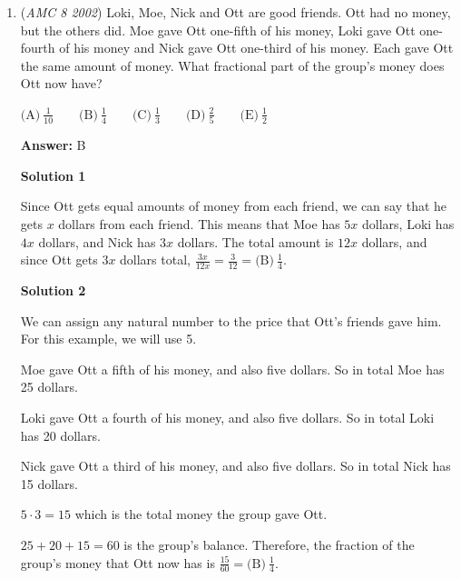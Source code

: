 \begin{enumerate}
 
 \[\frac{8/3}{8/3+4} \times 100 = \frac{8}{8+12} \times 100  = \boxed{\text{(B)}\ 40}\]




\textbf{Solution 2}

Since it doesn't matter how many pears and oranges there are, you can make the number of them whatever you like. In this case, we could use $6$, because it's the LCM of $2$ and $3$. Then for the $6$ pears, there are $6/3*8=16$ ounces of pear juice. For the 6 oranges, there are $6/2*8=24$ ounces of orange juice. Since we are looking for the percent of pear juice, we need to do $16/(16+24)=16/40$. Simplifying, we get $2/5$. Hence the answer is $\boxed{\text{(B)}\ 40}$.

 


	\item (\textit{AMC 8 2002}) Loki, Moe, Nick and Ott are good friends. Ott had no money, but the others did. Moe gave Ott one-fifth of his money, Loki gave Ott one-fourth of his money and Nick gave Ott one-third of his money. Each gave Ott the same amount of money. What fractional part of the group's money does Ott now have?


 $\text{(A)}\ \frac{1}{10} \qquad \text{(B)}\ \frac{1}{4} \qquad \text{(C)}\ \frac{1}{3} \qquad \text{(D)}\ \frac{2}{5} \qquad \text{(E)}\ \frac{1}{2}$

 \textbf{Answer: }B



\textbf{Solution 1}

Since Ott gets equal amounts of money from each friend, we can say that he gets $x$ dollars from each friend. This means that Moe has $5x$ dollars, Loki has $4x$ dollars, and Nick has $3x$ dollars. The total amount is $12x$ dollars, and since Ott gets $3x$ dollars total, $\frac{3x}{12x}= \frac{3}{12} = \boxed{\text{(B)}\ \frac14}$.

 



\textbf{Solution 2}

We can assign any natural number to the price that Ott's friends gave him. For this example, we will use 5.

 Moe gave Ott a fifth of his money, and also five dollars. So in total Moe has 25 dollars.

 Loki gave Ott a fourth of his money, and also five dollars. So in total Loki has 20 dollars.

 Nick gave Ott a third of his money, and also five dollars. So in total Nick has 15 dollars.

 $5\cdot3=15$ which is the total money the group gave Ott.

 $25+20+15=60$ is the group's balance. Therefore, the fraction of the group's money that Ott now has is $\frac{15}{60} = \boxed{\text{(B)}\ \frac14}$.

 


\end{enumerate}